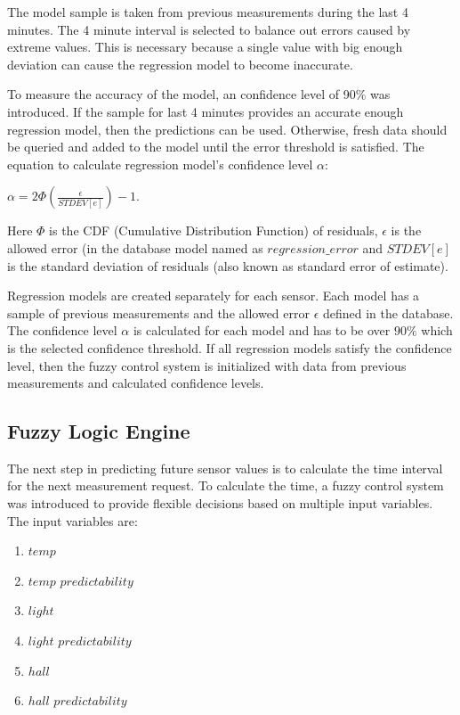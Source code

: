 The model sample is taken from previous measurements during the last 4 minutes. The 4 minute interval is selected to balance out errors caused by extreme values. This is necessary because a single value with big enough deviation can cause the regression model to become inaccurate. 

To measure the accuracy of the model, an confidence level of 90\% was introduced. If the sample for last 4 minutes provides an accurate enough regression model, then the predictions can be used. Otherwise, fresh data should be queried and added to the model until the error threshold is satisfied. The equation to calculate regression model's confidence level $\alpha$:\\

\begin{center}
$\alpha = 2\Phi \left ( \frac{\epsilon}{STDEV[e]}  \right ) - 1$.
\end{center}

Here $\Phi$ is the CDF (Cumulative Distribution Function) of residuals, $\epsilon$ is the allowed error (in the database model named as $regression\_error$ and $STDEV[e]$ is the standard deviation of residuals (also known as standard error of estimate). 

Regression models are created separately for each sensor. Each model has a sample of previous measurements and the allowed error $\epsilon$ defined in the database. 
The confidence level $\alpha$ is calculated for each model and has to be over $90\%$ which is the selected confidence threshold. If all regression models satisfy the confidence level, then the fuzzy control system is initialized with data from previous measurements and calculated confidence levels. 

\subsection{Fuzzy Logic Engine}

The next step in predicting future sensor values is to calculate the time interval for the next measurement request. To calculate the time, a fuzzy control system was introduced to provide flexible decisions based on multiple input variables. The input variables are: 
\begin{enumerate}
\item $temp$					
\item $temp$ $predictability$	
\item $light$					
\item $light$ $predictability$	
\item $hall$					
\item $hall$ $predictability$
\end{enumerate}

